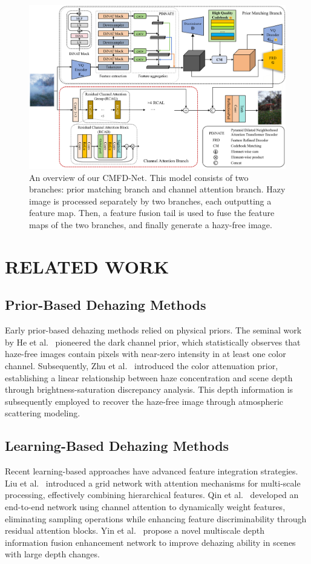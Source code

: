 \documentclass[journal]{IEEEtran}
\begin{document}
\begin{figure}[!t]
	\centering
	\includegraphics[width=7in]{images/network_architecture}
	\caption{An overview of our CMFD-Net. This model consists of two branches: prior matching branch and channel attention branch. Hazy image is processed separately by two branches, each outputting a feature map. Then, a feature fusion tail is used to fuse the feature maps of the two branches, and finally generate a hazy-free image.}
	\label{fig0}
\end{figure}

\section{RELATED WORK}
\subsection{Prior-Based Dehazing Methods}
Early prior-based dehazing methods relied on physical priors. The seminal work by He et al.~\cite{he2010single} pioneered the dark channel prior, which statistically observes that haze-free images contain pixels with near-zero intensity in at least one color channel. Subsequently, Zhu et al.~\cite{zhu2015fast} introduced the color attenuation prior, establishing a linear relationship between haze concentration and scene depth through brightness-saturation discrepancy analysis. This depth information is subsequently employed to recover the haze-free image through atmospheric scattering modeling.

\subsection{Learning-Based Dehazing Methods}
Recent learning-based approaches have advanced feature integration strategies. Liu et al.~\cite{liu2019griddehazenet} introduced a grid network with attention mechanisms for multi-scale processing, effectively combining hierarchical features. Qin et al.~\cite{qin2020ffa} developed an end-to-end network using channel attention to dynamically weight features, eliminating sampling operations while enhancing feature discriminability through residual attention blocks. Yin et al.~\cite{yin2023multiscale} propose a novel multiscale depth information fusion enhancement network to improve dehazing ability in scenes with large depth changes.
\end{document}
